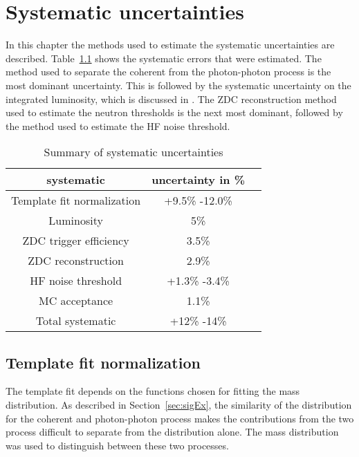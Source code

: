 \chapter{\label{sec:sysCheck}Systematic uncertainties}
  In this chapter the methods used to estimate the systematic 
    uncertainties are described. 
  Table~\ref{tab:sumsyst} shows the systematic errors that were estimated.
  The method used to separate the coherent from the photon-photon process 
   is the most dominant uncertainty.
  This is followed by the systematic uncertainty on the integrated luminosity,
    which is discussed in \cite{cmsLumi}.
  The ZDC reconstruction method used to estimate the neutron thresholds 
    is the next most dominant, followed by the method used to estimate
    the HF noise threshold. 
  \begin{table}[!Hhtb]
    \begin{center}
      \begin{tabular}{|c|c|c|}
        \hline
        systematic & uncertainty in \%  \\ \hline
        Template fit normalization & +9.5\% -12.0\% \\ \hline
        Luminosity & 5\% \\ \hline
        ZDC trigger efficiency & 3.5\%    \\ \hline
        ZDC reconstruction  & 2.9\%  \\ \hline
        HF noise threshold & +1.3\% -3.4\% \\ \hline 
        MC acceptance & 1.1\% \\ \hline
        \hline \hline
        Total systematic & +12\% -14\% \\ \hline
      \end{tabular}
      \caption{Summary of systematic uncertainties}
      \label{tab:sumsyst}
    \end{center}
  \end{table}

  \section{Template fit normalization}
    The \pt{} template fit depends on the functions chosen for fitting
      the mass distribution.
    As described in Section~\ref{sec:sigEx}, the similarity of the 
      \pt{} distribution for the coherent and photon-photon process makes
      the contributions from the two process difficult to separate from the 
      \pt{} distribution alone.
    The mass distribution was used to distinguish between these two processes.

